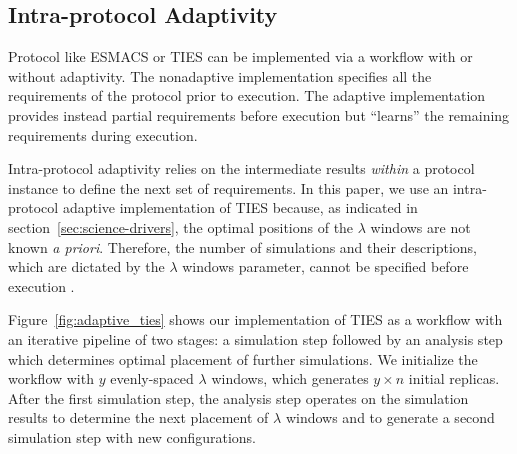 \subsection{Intra-protocol Adaptivity} 




Protocol like ESMACS or TIES can be implemented via a workflow with or
without adaptivity. The nonadaptive implementation specifies all the
requirements of the protocol prior to execution. The adaptive implementation
provides instead partial requirements before execution but ``learns'' the
remaining requirements during execution.

Intra-protocol adaptivity relies on the intermediate results \textit{within}
a protocol instance to define the next set of requirements. In this paper, we
use an intra-protocol adaptive implementation of TIES because, as indicated
in section~\ref{sec:science-drivers}, the optimal positions of the $\lambda$
windows are not known \textit{a priori}. Therefore, the number of simulations
and their descriptions, which are dictated by the $\lambda$ windows
parameter, cannot be specified before execution .

Figure~\ref{fig:adaptive_ties} shows our implementation of TIES as a workflow
with an iterative pipeline of two stages: a simulation step followed by an
analysis step which determines optimal placement  of further
simulations. We initialize the workflow with $y$ evenly-spaced $\lambda$
windows, which generates $y \times n$ initial replicas. After the first
simulation step, the analysis step operates on the simulation results to
determine the next placement of $\lambda$ windows and to generate a second
simulation step with new configurations. 

